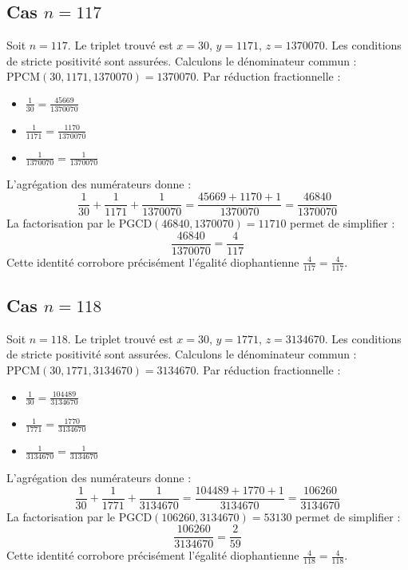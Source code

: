 \documentclass[11pt,a4paper]{article}
\begin{document}
\subsection{Cas $n = 117$}
Soit $n = 117$. Le triplet trouvé est $x = 30$, $y = 1171$, $z = 1370070$.
Les conditions de stricte positivité sont assurées.
Calculons le dénominateur commun : $\text{PPCM}(30, 1171, 1370070) = 1370070$.
Par réduction fractionnelle :
\begin{itemize}
    \item $\frac{1}{30} = \frac{45669}{1370070}$
    \item $\frac{1}{1171} = \frac{1170}{1370070}$
    \item $\frac{1}{1370070} = \frac{1}{1370070}$
\end{itemize}
L'agrégation des numérateurs donne :
$$ \frac{1}{30} + \frac{1}{1171} + \frac{1}{1370070} = \frac{45669 + 1170 + 1}{1370070} = \frac{46840}{1370070} $$
La factorisation par le $\text{PGCD}(46840, 1370070) = 11710$ permet de simplifier :
$$ \frac{46840}{1370070} = \frac{4}{117} $$
Cette identité corrobore précisément l'égalité diophantienne $\frac{4}{117} = \frac{4}{117}$.

\subsection{Cas $n = 118$}
Soit $n = 118$. Le triplet trouvé est $x = 30$, $y = 1771$, $z = 3134670$.
Les conditions de stricte positivité sont assurées.
Calculons le dénominateur commun : $\text{PPCM}(30, 1771, 3134670) = 3134670$.
Par réduction fractionnelle :
\begin{itemize}
    \item $\frac{1}{30} = \frac{104489}{3134670}$
    \item $\frac{1}{1771} = \frac{1770}{3134670}$
    \item $\frac{1}{3134670} = \frac{1}{3134670}$
\end{itemize}
L'agrégation des numérateurs donne :
$$ \frac{1}{30} + \frac{1}{1771} + \frac{1}{3134670} = \frac{104489 + 1770 + 1}{3134670} = \frac{106260}{3134670} $$
La factorisation par le $\text{PGCD}(106260, 3134670) = 53130$ permet de simplifier :
$$ \frac{106260}{3134670} = \frac{2}{59} $$
Cette identité corrobore précisément l'égalité diophantienne $\frac{4}{118} = \frac{4}{118}$.
\end{document}

